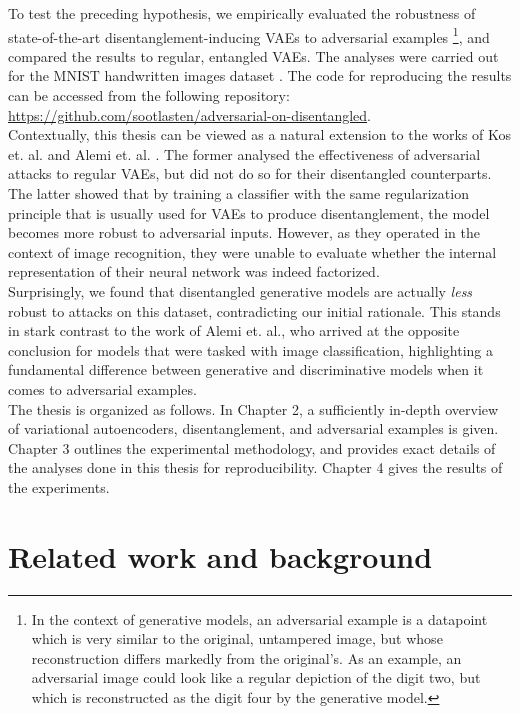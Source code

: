 \documentclass{report}
\begin{document}
\noindent To test the preceding hypothesis, we empirically evaluated the robustness of state-of-the-art disentanglement-inducing VAEs to adversarial examples \footnote{In the context of generative models, an adversarial example is a datapoint which is very similar to the original, untampered image, but whose reconstruction differs markedly from the original's. As an example, an adversarial image could look like a regular depiction of the digit two, but which is reconstructed as the digit four by the generative model.}, and compared the results to regular, entangled VAEs. The analyses were carried out for the MNIST handwritten images dataset \cite{mnist}. The code for reproducing the results can be accessed from the following repository: \url{https://github.com/sootlasten/adversarial-on-disentangled}. \\

\noindent Contextually, this thesis can be viewed as a natural extension to the works of Kos et. al. \cite{kos-gen-adv} and Alemi et. al. \cite{deep-variational-bottleneck}. The former analysed the effectiveness of adversarial attacks to regular VAEs, but did not do so for their disentangled counterparts. The latter showed that by training a classifier with the same regularization principle that is usually used for VAEs to produce disentanglement, the model becomes more robust to adversarial inputs. However, as they operated in the context of image recognition, they were unable to evaluate whether the internal representation of their neural network was indeed factorized. \\

\noindent Surprisingly, we found that disentangled generative models are actually \textit{less} robust to attacks on this dataset, contradicting our initial rationale. This stands in stark contrast to the work of Alemi et. al., who arrived at the opposite conclusion for models that were tasked with image classification, highlighting a fundamental difference between generative and discriminative models when it comes to adversarial examples. \\

\noindent The thesis is organized as follows. In Chapter 2, a sufficiently in-depth overview of variational autoencoders, disentanglement, and adversarial examples is given. Chapter 3 outlines the experimental methodology, and provides exact details of the analyses done in this thesis for reproducibility. Chapter 4 gives the results of the experiments. 

\chapter{Related work and background}
\end{document}
